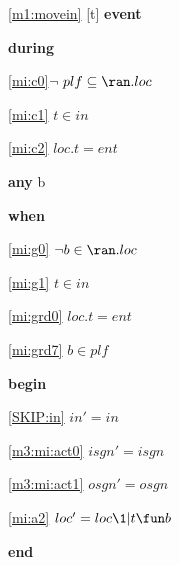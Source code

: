 \noindent \ref{m1:movein} [t] \textbf{event}
\begin{block}
\item \textbf{during}
\begin{block}
\item[ \eqref{mi:c0} ]$\!\! \neg ~ plf \subseteq \ran.loc $ %
\item[ \eqref{mi:c1} ]$t \in in $ %
\item[ \eqref{mi:c2} ]$loc.t = ent $ %
\end{block}
\item \textbf{any} b
\item \textbf{when}
\begin{block}
\item[ \eqref{mi:g0} ]$\neg b \in \ran.loc  	$ %
\item[ \eqref{mi:g1} ]$t \in in $ %
\item[ \eqref{mi:grd0} ]$loc.t = ent $ %
\item[ \eqref{mi:grd7} ]$b \in plf $ %
\end{block}
\item \textbf{begin}
\begin{block}
\item[ \eqref{SKIP:in} ]$in' = in$ %
\item[ \eqref{m3:mi:act0} ]$isgn' = isgn$ %
\item[ \eqref{m3:mi:act1} ]$osgn' = osgn$ %
\item[ \eqref{mi:a2} ]$loc' = loc \1| t \fun b $ %
\end{block}
\item \textbf{end} \\
\end{block}

